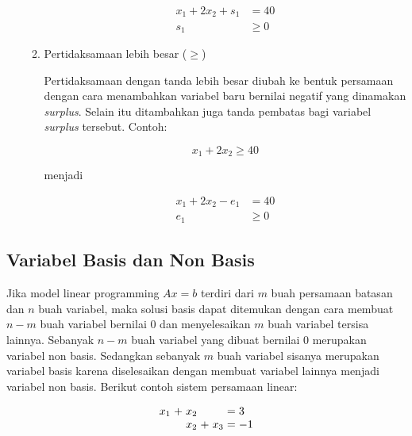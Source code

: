 \begin{enumerate}
\begin{enumerate}
				\begin{equation*}
					\begin{split}
						x_1 + 2x_2 + s_1 &= 40\\
						s_1 &\geq 0
					\end{split}
				\end{equation*}
			
			\item Pertidaksamaan lebih besar (\(\geq\))
			
				Pertidaksamaan dengan tanda lebih besar diubah ke bentuk persamaan dengan cara menambahkan variabel baru bernilai negatif yang dinamakan \textit{surplus}. Selain itu ditambahkan juga tanda pembatas bagi variabel \textit{surplus} tersebut. Contoh:
				
				\begin{equation*}
					x_1 + 2x_2 \geq 40
				\end{equation*}
				
				menjadi
				
				\begin{equation*}
					\begin{split}
						x_1 + 2x_2 - e_1 &= 40\\
						e_1 &\geq 0
					\end{split}
				\end{equation*}
		\end{enumerate}	
\end{enumerate}

\subsection{Variabel Basis dan Non Basis}
\label{variabel_basis_dan_non_basis}

Jika model linear programming \(Ax = b\) terdiri dari \(m\) buah persamaan batasan dan \(n\) buah variabel, maka solusi basis dapat ditemukan dengan cara membuat \(n - m\) buah variabel bernilai 0 dan menyelesaikan \(m\) buah variabel tersisa lainnya. Sebanyak \(n - m\) buah variabel yang dibuat bernilai 0 merupakan variabel non basis. Sedangkan sebanyak \(m\) buah variabel sisanya merupakan variabel basis karena diselesaikan dengan membuat variabel lainnya menjadi variabel non basis. Berikut contoh sistem persamaan linear:

\begin{equation*}
	\setlength\arraycolsep{1.5pt}
	\begin{array}{r c r c r c l}
		x_1 &+ &x_2 &  &    &= &3\\
		    &  &x_2 &+ &x_3 &= &-1
	\end{array}
\end{equation*}

